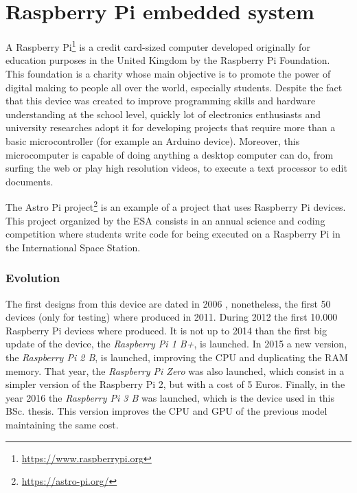 \section{Raspberry Pi embedded system}

A Raspberry Pi\footnote{\url{https://www.raspberrypi.org}} is a credit card-sized computer developed originally for education purposes in the United Kingdom by the Raspberry Pi Foundation. This foundation is a charity whose main objective is to promote the power of digital making to people all over the world, especially students. Despite the fact that this device was created to improve programming skills and hardware understanding at the school level, quickly lot of electronics enthusiasts and university researches adopt it for developing projects that require more than a basic microcontroller (for example an Arduino device). Moreover, this microcomputer is capable of doing anything a desktop computer can do, from surfing the web or play high resolution videos, to execute a text processor to edit documents.

The Astro Pi project\footnote{\url{https://astro-pi.org/}} is an example of a project that uses Raspberry Pi devices. This project organized by the \ac{ESA} consists in an annual science and coding competition where students write code for being executed on a Raspberry Pi in the International Space Station.

\subsubsection{Evolution}
The first designs from this device are dated in 2006 \cite{Upt11}, nonetheless, the first 50 devices (only for testing) where produced in 2011. During 2012 the first 10.000 Raspberry Pi devices where produced. It is not up to 2014 than the first big update of the device, the \textit{Raspberry Pi 1 B+}, is launched. In 2015 a new version, the \textit{Raspberry Pi 2 B}, is launched, improving the \ac{CPU} and duplicating the RAM memory. That year, the \textit{Raspberry Pi Zero} was also launched, which consist in a simpler version of the Raspberry Pi 2, but with a cost of 5 Euros. Finally, in the year 2016 the \textit{Raspberry Pi 3 B} was launched, which is the device used in this \ac{BSc.} thesis. This version improves the \ac{CPU} and \ac{GPU} of the previous model maintaining the same cost.  


